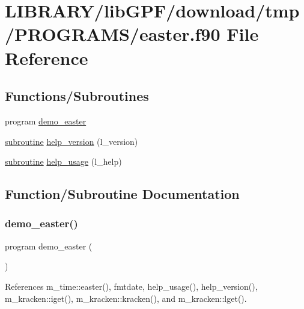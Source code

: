 \hypertarget{easter_8f90}{}\section{L\+I\+B\+R\+A\+R\+Y/lib\+G\+P\+F/download/tmp/\+P\+R\+O\+G\+R\+A\+M\+S/easter.f90 File Reference}
\label{easter_8f90}
\subsection*{Functions/\+Subroutines}
\begin{DoxyCompactItemize}
\item 
program \hyperlink{easter_8f90_a88204fbb77f8ba73861da3733036d7f0}{demo\+\_\+easter}
\item 
\hyperlink{M__stopwatch_83_8txt_acfbcff50169d691ff02d4a123ed70482}{subroutine} \hyperlink{easter_8f90_af4f863a9a969771c1766c7a11ae2ac43}{help\+\_\+version} (l\+\_\+version)
\item 
\hyperlink{M__stopwatch_83_8txt_acfbcff50169d691ff02d4a123ed70482}{subroutine} \hyperlink{easter_8f90_ab07ad49e68ac3d3df8e071fd42bbf84e}{help\+\_\+usage} (l\+\_\+help)
\end{DoxyCompactItemize}


\subsection{Function/\+Subroutine Documentation}
\mbox{\label{easter_8f90_a88204fbb77f8ba73861da3733036d7f0}} 
\subsubsection{\texorpdfstring{demo\+\_\+easter()}{demo\_easter()}}
{\footnotesize\ttfamily program demo\+\_\+easter (\begin{DoxyParamCaption}{ }\end{DoxyParamCaption})}



References m\+\_\+time\+::easter(), fmtdate, help\+\_\+usage(), help\+\_\+version(), m\+\_\+kracken\+::iget(), m\+\_\+kracken\+::kracken(), and m\+\_\+kracken\+::lget().

